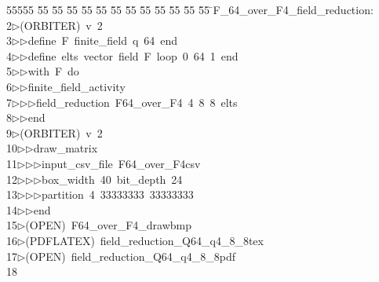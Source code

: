 %
%
\begin{tabbing}
55555 \= 55 \= 55 \= 55 \= 55 \= 55 \= 55 \= 55 \= 55 \= 55 \= 55 \= 55 \= 55 \= \>F\_64\_over\_F4\_field\_reduction:\\[0pt]
2\>$\triangleright$\>(ORBITER)\ v\ 2\ \\[0pt]
3\>$\triangleright$\>$\triangleright$\>define\ F\ finite\_field\ q\ 64\ end\ \\[0pt]
4\>$\triangleright$\>$\triangleright$\>define\ elts\ vector\ field\ F\ loop\ 0\ 64\ 1\ end\ \\[0pt]
5\>$\triangleright$\>$\triangleright$\>with\ F\ do\ \\[0pt]
6\>$\triangleright$\>$\triangleright$\>finite\_field\_activity\ \\[0pt]
7\>$\triangleright$\>$\triangleright$\>$\triangleright$\>field\_reduction\ F64\_over\_F4\ 4\ 8\ 8\ elts\ \\[0pt]
8\>$\triangleright$\>$\triangleright$\>end\\[0pt]
9\>$\triangleright$\>(ORBITER)\ v\ 2\ \\[0pt]
10\>$\triangleright$\>$\triangleright$\>draw\_matrix\ \\[0pt]
11\>$\triangleright$\>$\triangleright$\>$\triangleright$\>input\_csv\_file\ F64\_over\_F4csv\ \\[0pt]
12\>$\triangleright$\>$\triangleright$\>$\triangleright$\>box\_width\ 40\ bit\_depth\ 24\ \\[0pt]
13\>$\triangleright$\>$\triangleright$\>$\triangleright$\>partition\ 4\ 33333333\ 33333333\ \\[0pt]
14\>$\triangleright$\>$\triangleright$\>end\\[0pt]
15\>$\triangleright$\>(OPEN)\ F64\_over\_F4\_drawbmp\\[0pt]
16\>$\triangleright$\>(PDFLATEX)\ field\_reduction\_Q64\_q4\_8\_8tex\\[0pt]
17\>$\triangleright$\>(OPEN)\ field\_reduction\_Q64\_q4\_8\_8pdf\\[0pt]
18\>\end{tabbing}
